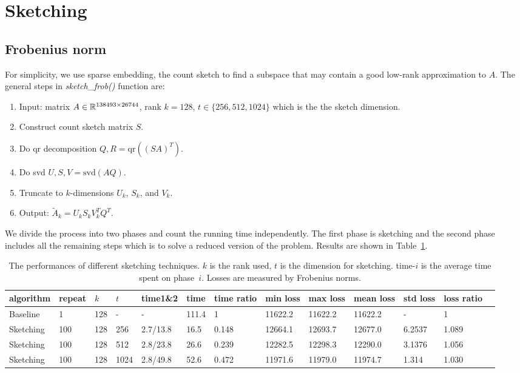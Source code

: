 \section{Sketching}

\subsection{Frobenius norm}
For simplicity, we use sparse embedding, \ie the count sketch
to find a subspace that may contain a good low-rank approximation to $A$.
The general steps in \textit{sketch\_frob()} function are:
\begin{enumerate}
    \item Input: matrix $A\in {\mathbb{R}}^{138493\times 26744}$,
        rank $k=128$,
        $t\in\{256, 512, 1024\}$ which is the the sketch dimension.
    \item Construct count sketch matrix $S$.
    \item Do qr decomposition $Q, R = \text{qr}((SA)^T)$.
    \item Do svd $U, S, V = \text{svd}(AQ)$.
    \item Truncate to $k$-dimensions $U_k$, $S_k$, and $V_k$.
    \item Output: $\tilde{A}_k = U_k S_k V_k^T Q^T$.
\end{enumerate}

We divide the process into two phases and count the running time independently.
The first phase is sketching and
the second phase includes all the remaining steps
which is to solve a reduced version of the problem.
Results are shown in Table~\ref{tab:frob}.

\begin{table}[htb]
  \setlength{\tabcolsep}{2.6pt}
  \caption{The performances of different sketching techniques.
  $k$ is the rank used, $t$ is the dimension for sketching.
  time-$i$ is the average time spent on phase~$i$.
  Losses are measured by Frobenius norms.
    }
  \label{tab:frob}
  \centering
  {\small
  \begin{tabular}{lllllllllllll}
    \toprule
    algorithm & repeat & $k$ & $t$ & time1\&2 & time & time ratio & min loss & max loss & mean loss & std loss & loss ratio \\
    \midrule
    Baseline & 1 & 128 & - & - & 111.4 & 1 & 11622.2 & 11622.2 & 11622.2 & - & 1 \\
    Sketching & 100 & 128 & 256 & 2.7/13.8 & 16.5 & 0.148 & 12664.1 & 12693.7 & 12677.0 & 6.2537 & 1.089 \\
    Sketching & 100 & 128 & 512 & 2.8/23.8 & 26.6 & 0.239 & 12282.5 & 12298.3 & 12290.0 & 3.1376 & 1.056 \\
    Sketching & 100 & 128 & 1024 & 2.8/49.8 & 52.6 & 0.472 & 11971.6 & 11979.0 & 11974.7 & 1.314 & 1.030 \\
    \bottomrule
  \end{tabular}
  }
\end{table}

